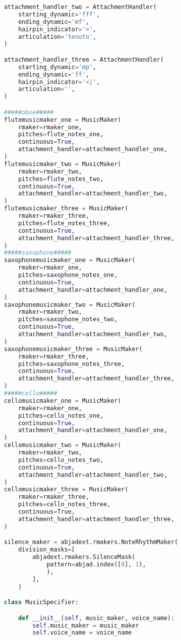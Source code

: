 \begin{lstlisting}[language=Python, caption=Four Ages of Sand Segment\_IV]
attachment_handler_two = AttachmentHandler(
    starting_dynamic='fff',
    ending_dynamic='mf',
    hairpin_indicator='>',
    articulation='tenuto',
)

attachment_handler_three = AttachmentHandler(
    starting_dynamic='mp',
    ending_dynamic='ff',
    hairpin_indicator='<|',
    articulation='',
)

#####oboe#####
flutemusicmaker_one = MusicMaker(
    rmaker=rmaker_one,
    pitches=flute_notes_one,
    continuous=True,
    attachment_handler=attachment_handler_one,
)
flutemusicmaker_two = MusicMaker(
    rmaker=rmaker_two,
    pitches=flute_notes_two,
    continuous=True,
    attachment_handler=attachment_handler_two,
)
flutemusicmaker_three = MusicMaker(
    rmaker=rmaker_three,
    pitches=flute_notes_three,
    continuous=True,
    attachment_handler=attachment_handler_three,
)
#####saxophone#####
saxophonemusicmaker_one = MusicMaker(
    rmaker=rmaker_one,
    pitches=saxophone_notes_one,
    continuous=True,
    attachment_handler=attachment_handler_one,
)
saxophonemusicmaker_two = MusicMaker(
    rmaker=rmaker_two,
    pitches=saxophone_notes_two,
    continuous=True,
    attachment_handler=attachment_handler_two,
)
saxophonemusicmaker_three = MusicMaker(
    rmaker=rmaker_three,
    pitches=saxophone_notes_three,
    continuous=True,
    attachment_handler=attachment_handler_three,
)
#####cello#####
cellomusicmaker_one = MusicMaker(
    rmaker=rmaker_one,
    pitches=cello_notes_one,
    continuous=True,
    attachment_handler=attachment_handler_one,
)
cellomusicmaker_two = MusicMaker(
    rmaker=rmaker_two,
    pitches=cello_notes_two,
    continuous=True,
    attachment_handler=attachment_handler_two,
)
cellomusicmaker_three = MusicMaker(
    rmaker=rmaker_three,
    pitches=cello_notes_three,
    continuous=True,
    attachment_handler=attachment_handler_three,
)

silence_maker = abjadext.rmakers.NoteRhythmMaker(
    division_masks=[
        abjadext.rmakers.SilenceMask(
            pattern=abjad.index([0], 1),
            ),
        ],
    )

class MusicSpecifier:

    def __init__(self, music_maker, voice_name):
        self.music_maker = music_maker
        self.voice_name = voice_name


\end{lstlisting}
